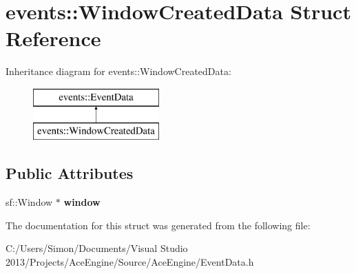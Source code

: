 \hypertarget{structevents_1_1_window_created_data}{}\section{events\+:\+:Window\+Created\+Data Struct Reference}
\label{structevents_1_1_window_created_data}
Inheritance diagram for events\+:\+:Window\+Created\+Data\+:\begin{figure}[H]
\begin{center}
\leavevmode
\includegraphics[height=2.000000cm]{structevents_1_1_window_created_data}
\end{center}
\end{figure}
\subsection*{Public Attributes}
\begin{DoxyCompactItemize}
\item 
\hypertarget{structevents_1_1_window_created_data_a4b28b3577391b16a811b013cfd5e75a8}{}sf\+::\+Window $\ast$ {\bfseries window}\label{structevents_1_1_window_created_data_a4b28b3577391b16a811b013cfd5e75a8}

\end{DoxyCompactItemize}


The documentation for this struct was generated from the following file\+:\begin{DoxyCompactItemize}
\item 
C\+:/\+Users/\+Simon/\+Documents/\+Visual Studio 2013/\+Projects/\+Ace\+Engine/\+Source/\+Ace\+Engine/Event\+Data.\+h\end{DoxyCompactItemize}
